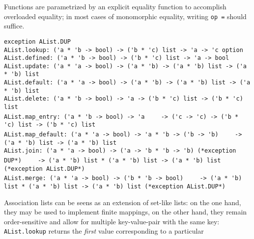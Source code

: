 \begin{isabellebody}
\begin{isamarkuptext}
  Functions are parametrized by an explicit equality function
  to accomplish overloaded equality;  in most cases of monomorphic
  equality, writing \verb|op =| should suffice.%
\end{isamarkuptext}%
\isamarkuptrue%
%
\isamarkuptrue%
%
\begin{isamarkuptext}%
\begin{mldecls}
  \verb|exception AList.DUP| \\
  \verb|AList.lookup: ('a * 'b -> bool) -> ('b * 'c) list -> 'a -> 'c option| \\
  \verb|AList.defined: ('a * 'b -> bool) -> ('b * 'c) list -> 'a -> bool| \\
  \verb|AList.update: ('a * 'a -> bool) -> ('a * 'b) -> ('a * 'b) list -> ('a * 'b) list| \\
  \verb|AList.default: ('a * 'a -> bool) -> ('a * 'b) -> ('a * 'b) list -> ('a * 'b) list| \\
  \verb|AList.delete: ('a * 'b -> bool) -> 'a -> ('b * 'c) list -> ('b * 'c) list| \\
  \verb|AList.map_entry: ('a * 'b -> bool) -> 'a|\isasep\isanewline%
\verb|    -> ('c -> 'c) -> ('b * 'c) list -> ('b * 'c) list| \\
  \verb|AList.map_default: ('a * 'a -> bool) -> 'a * 'b -> ('b -> 'b)|\isasep\isanewline%
\verb|    -> ('a * 'b) list -> ('a * 'b) list| \\
  \verb|AList.join: ('a * 'a -> bool) -> ('a -> 'b * 'b -> 'b) (*exception DUP*)|\isasep\isanewline%
\verb|    -> ('a * 'b) list * ('a * 'b) list -> ('a * 'b) list (*exception AList.DUP*)| \\
  \verb|AList.merge: ('a * 'a -> bool) -> ('b * 'b -> bool)|\isasep\isanewline%
\verb|    -> ('a * 'b) list * ('a * 'b) list -> ('a * 'b) list (*exception AList.DUP*)|
  \end{mldecls}%
\end{isamarkuptext}%
\isamarkuptrue%
%
\begin{isamarkuptext}%
Association lists can be seens as an extension of set-like lists:
  on the one hand, they may be used to implement finite mappings,
  on the other hand, they remain order-sensitive and allow for
  multiple key-value-pair with the same key: \verb|AList.lookup|
  returns the \emph{first} value corresponding to a particular

\end{isamarkuptext}
\end{isabellebody}
